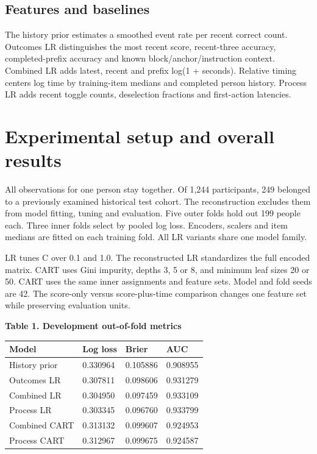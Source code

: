 \documentclass[10pt]{article}
\begin{document}
\subsection*{Features and baselines}
The history prior estimates a smoothed event rate per recent correct count. Outcomes LR distinguishes the most recent score, recent-three accuracy, completed-prefix accuracy and known block/anchor/instruction context. Combined LR adds latest, recent and prefix log(1 + seconds). Relative timing centers log time by training-item medians and completed person history. Process LR adds recent toggle counts, deselection fractions and first-action latencies.

\clearpage
\section*{Experimental setup and overall results}
All observations for one person stay together. Of 1,244 participants, 249 belonged to a previously examined historical test cohort. The reconstruction excludes them from model fitting, tuning and evaluation. Five outer folds hold out 199 people each. Three inner folds select by pooled log loss. Encoders, scalers and item medians are fitted on each training fold. All LR variants share one model family.

LR tunes C over 0.1 and 1.0. The reconstructed LR standardizes the full encoded matrix. CART uses Gini impurity, depths 3, 5 or 8, and minimum leaf sizes 20 or 50. CART uses the same inner assignments and feature sets. Model and fold seeds are 42. The score-only versus score-plus-time comparison changes one feature set while preserving evaluation units.

\noindent\textbf{Table 1. Development out-of-fold metrics}\par
\begin{tabular}{llll}
\toprule
Model & Log loss & Brier & AUC \\
\midrule
History prior & 0.330964 & 0.105886 & 0.908955 \\
Outcomes LR & 0.307811 & 0.098606 & 0.931279 \\
Combined LR & 0.304950 & 0.097459 & 0.933109 \\
Process LR & 0.303345 & 0.096760 & 0.933799 \\
Combined CART & 0.313132 & 0.099607 & 0.924953 \\
Process CART & 0.312967 & 0.099675 & 0.924587 \\
\bottomrule
\end{tabular}
\end{document}
